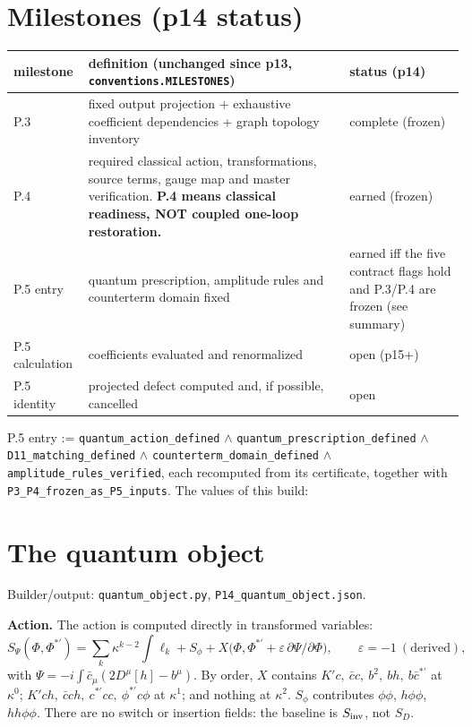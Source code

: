 \section{Milestones (p14 status)}\label{sec:p14-milestones}
\begin{center}\small
\begin{tabular}{@{}p{2.6cm}p{9.2cm}p{3.4cm}@{}}
\toprule
milestone & definition (unchanged since p13, \texttt{conventions.MILESTONES}) & status (p14)\\
\midrule
P.3 & fixed output projection + exhaustive coefficient dependencies + graph topology inventory & complete (frozen)\\
P.4 & required classical action, transformations, source terms, gauge map and master verification.
\textbf{P.4 means classical readiness, NOT coupled one-loop restoration.} & earned (frozen)\\
P.5 entry & quantum prescription, amplitude rules and counterterm domain fixed & earned iff the five contract flags
hold and P.3/P.4 are frozen (see summary)\\
P.5 calculation & coefficients evaluated and renormalized & open (p15+)\\
P.5 identity & projected defect computed and, if possible, cancelled & open\\
\bottomrule
\end{tabular}
\end{center}
P.5 entry := \texttt{quantum\_action\_defined} $\wedge$ \texttt{quantum\_prescription\_defined} $\wedge$
\texttt{D11\_matching\_defined} $\wedge$ \texttt{counterterm\_domain\_defined} $\wedge$ \texttt{amplitude\_rules\_verified},
each recomputed from its certificate, together with \texttt{P3\_P4\_frozen\_as\_P5\_inputs}. The values of this build:


\section{The quantum object}\label{sec:p14-object}
\noindent Builder/output: \texttt{quantum\_object.py}, \texttt{P14\_quantum\_object.json}.\par\smallskip
\textbf{Action.} The action is computed directly in transformed variables:
\[S_\Psi(\Phi,\Phi^{*\prime})=\sum_k\kappa^{k-2}\!\int\ell_k+S_\phi+X\big(\Phi,\Phi^{*\prime}+\varepsilon\,\partial\Psi/\partial\Phi\big),
\qquad\varepsilon=-1\ (\text{derived}),\]
with $\Psi=-i\int\bar c_\mu(2D^\mu[h]-b^\mu)$. By order, $X$ contains $K'c,\ \bar c c,\ b^2,\ bh,\ b\bar c^{*\prime}$ at
$\kappa^0$; $K'ch,\ \bar cch,\ c^{*\prime}cc,\ \phi^{*\prime}c\phi$ at $\kappa^1$; and nothing at $\kappa^2$. $S_\phi$
contributes $\phi\phi$, $h\phi\phi$, $hh\phi\phi$. There are no switch or insertion fields: the baseline is $S_{\rm inv}$,
not $S_D$.

